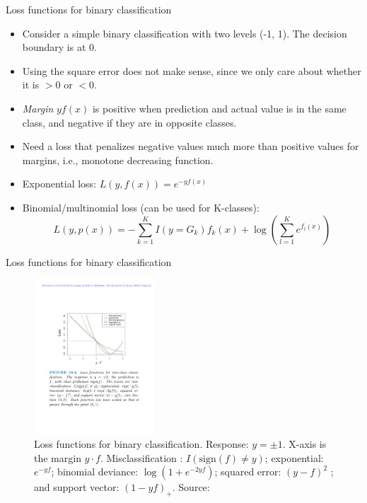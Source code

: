 \documentclass[aspectratio=169]{beamer}
\begin{document}
\begin{frame}{Loss functions for binary classification}
    \begin{itemize}
        \item Consider a simple binary classification with two levels (-1, 1). The decision boundary is at 0.
        \item Using the square error does not make sense, since we only care about whether it is $>0$ or $<0$.
        \item \textit{Margin} $yf(x)$ is positive when prediction and actual value is in the same class, and negative if they are in opposite classes.
        \item Need a loss that penalizes negative values much more than positive values for margins, i.e., monotone decreasing function.
        \item Exponential loss: $L(y, f(x)) = e^{-yf(x)}$
        \item Binomial/multinomial loss (can be used for K-classes):
        \begin{equation*}
            L(y, p(x)) = -\sum_{k=1}^K I(y=G_k)f_k(x) + \log \left(\sum_{l=1}^K e^{f_l(x)}\right)
        \end{equation*}
    \end{itemize}
\end{frame}


\begin{frame}{Loss functions for binary classification}
\begin{figure}
    \centering
    \includegraphics[width=0.4\textwidth]{figures/lossfunctions.pdf}
    \caption{Loss functions for binary classification. Response: $y = \pm1$. X-axis is the margin $y \cdot f$. Misclassification : $I(\mathrm{sign}(f) \neq y)$; exponential: $e^{-yf}$; binomial deviance: $\log(1 + e^{-2yf})$; squared error: $(y - f)^2$ ; and support vector: $(1 - yf)_+$. Source: \cite{hastieElementsStatisticalLearning2016}}
\end{figure}
\end{frame}
\end{document}
